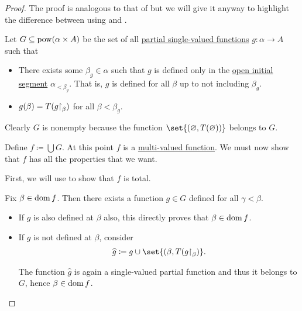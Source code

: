 \begin{proof}
  The proof is analogous to that of  but we will give it anyway to highlight the difference between using  and .

  Let \( G \subseteq \operatorname{pow}(\alpha \times A) \) be the set of all \hyperref[def:partial_function]{partial single-valued functions} \( g: \alpha \to A \) such that
  \begin{itemize}
    \item There exists some \( \beta_g \in \alpha \) such that \( g \) is defined only in the \hyperref[def:partially_ordered_set_interval/ray]{open initial segment} \( \alpha_{< \beta_g} \). That is, \( g \) is defined for all \( \beta \) up to not including \( \beta_g \).

    \item \( g(\beta) = T(g{\upharpoonright}_\beta) \) for all \( \beta < \beta_g \).
  \end{itemize}

  Clearly \( G \) is nonempty because the function \( \set{ (\varnothing, T(\varnothing)) } \) belongs to \( G \).

  Define \( f \coloneqq \bigcup G \). At this point \( f \) is a \hyperref[def:multi_valued_function]{multi-valued function}. We must now show that \( f \) has all the properties that we want.

   First, we will use  to show that \( f \) is total.

  Fix \( \beta \in \operatorname{dom} f \). Then there exists a function \( g \in G \) defined for all \( \gamma < \beta \).

  \begin{itemize}
    \item If \( g \) is also defined at \( \beta \) also, this directly proves that \( \beta \in \operatorname{dom} f \).
    \item If \( g \) is not defined at \( \beta \), consider
    \begin{equation*}
      \widehat g \coloneqq g \cup \set{ (\beta, T(g\restr_\beta) }.
    \end{equation*}

    The function \( \widehat g \) is again a single-valued partial function and thus it belongs to \( G \), hence \( \beta \in \operatorname{dom} f \).
  \end{itemize}


\end{proof}
